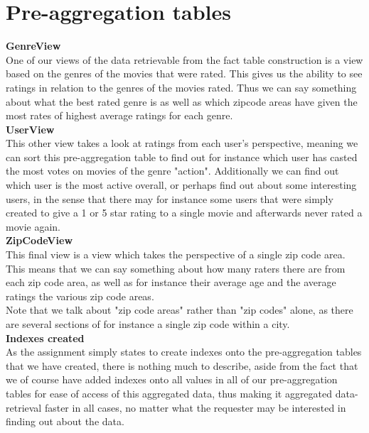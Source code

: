 \section*{Pre-aggregation tables}

\noindent\textbf{GenreView} \\
One of our views of the data retrievable from the fact table construction is a view based on the genres of the movies that were rated. This gives us the ability to see ratings in relation to the genres of the movies rated. Thus we can say something about what the best rated genre is as well as which zipcode areas have given the most rates of highest average ratings for each genre. \\

\noindent\textbf{UserView} \\
This other view takes a look at ratings from each user's perspective, meaning we can sort this pre-aggregation table to find out for instance which user has casted the most votes on movies of the genre "action". Additionally we can find out which user is the most active overall, or perhaps find out about some interesting users, in the sense that there may for instance some users that were simply created to give a 1 or 5 star rating to a single movie and afterwards never rated a movie again. \\

\noindent\textbf{ZipCodeView} \\
This final view is a view which takes the perspective of a single zip code area. This means that we can say something about how many raters there are from each zip code area, as well as for instance their average age and the average ratings the various zip code areas. \\
Note that we talk about "zip code areas" rather than "zip codes" alone, as there are several sections of for instance a single zip code within a city. \\

\noindent\textbf{Indexes created} \\
As the assignment simply states to create indexes onto the pre-aggregation tables that we have created, there is nothing much to describe, aside from the fact that we of course have added indexes onto all values in all of our pre-aggregation tables for ease of access of this aggregated data, thus making it aggregated data-retrieval faster in all cases, no matter what the requester may be interested in finding out about the data.
